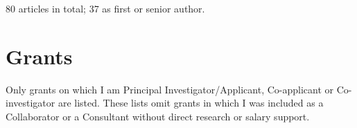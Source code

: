 \documentclass[11pt]{moderncv}
\begin{document}

80 articles in total; 37 as first or senior author.

\begin{refsection}
\nocite{*}

\printbibliography[heading=subbibliography,title=Articles]
\end{refsection}

%
%

\begin{refsection}


\nocite{*}
\printbibliography[heading=subbibliography,title=Book chapters]
\end{refsection}




\begin{refsection}
\nocite{*}
\printbibliography[heading=subbibliography,title=Conference publications]
\end{refsection}




\section{Grants}

Only grants on which I am Principal Investigator/Applicant, Co-applicant or Co-investigator are listed.
These lists omit grants in which I was included as a Collaborator or a Consultant without direct research or salary support.
\end{document}

